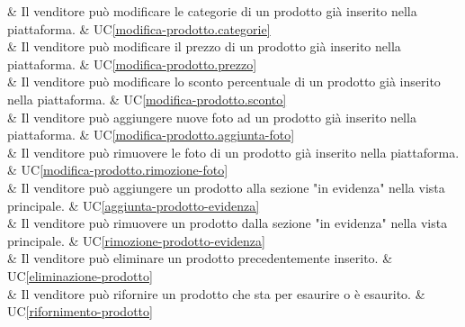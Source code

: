  & Il venditore può modificare le categorie di un prodotto già inserito nella piattaforma. & UC\ref{modifica-prodotto.categorie} \\
    
 & Il venditore può modificare il prezzo di un prodotto già inserito nella piattaforma. & UC\ref{modifica-prodotto.prezzo} \\
    
 & Il venditore può modificare lo sconto percentuale di un prodotto già inserito nella piattaforma. & UC\ref{modifica-prodotto.sconto} \\
    
 & Il venditore può aggiungere nuove foto ad un prodotto già inserito nella piattaforma. & UC\ref{modifica-prodotto.aggiunta-foto} \\
    
 & Il venditore può rimuovere le foto di un prodotto già inserito nella piattaforma. & UC\ref{modifica-prodotto.rimozione-foto} \\
    
 & Il venditore può aggiungere un prodotto alla sezione "in evidenza" nella vista principale. & UC\ref{aggiunta-prodotto-evidenza} \\
    
 & Il venditore può rimuovere un prodotto dalla sezione "in evidenza" nella vista principale. & UC\ref{rimozione-prodotto-evidenza} \\
    
 & Il venditore può eliminare un prodotto precedentemente inserito. & UC\ref{eliminazione-prodotto} \\
    
 & Il venditore può rifornire un prodotto che sta per esaurire o è esaurito. & UC\ref{rifornimento-prodotto} \\